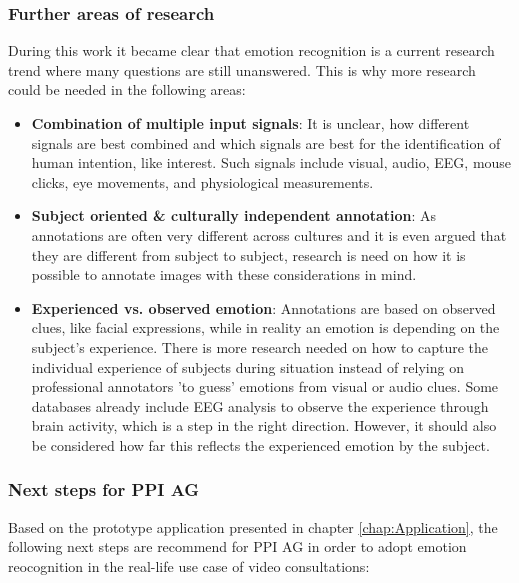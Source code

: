 \subsubsection{Further areas of research}
During this work it became clear that emotion recognition is a current research trend where many questions are still unanswered. This is why more research could be needed in the following areas:
\begin{itemize}
    \item \textbf{Combination of multiple input signals}: It is unclear, how different signals are best combined and which signals are best for the identification of human intention, like interest. Such signals include visual, audio, EEG, mouse clicks, eye movements, and physiological measurements.
    \item \textbf{Subject oriented \& culturally independent annotation}: As annotations are often very different across cultures and it is even argued that they are different from subject to subject, research is need on how it is possible to annotate images with these considerations in mind. 
    \item \textbf{Experienced vs. observed emotion}: Annotations are based on observed clues, like facial expressions, while in reality an emotion is depending on the subject's experience. There is more research needed on how to capture the individual experience of subjects during situation instead of relying on professional annotators 'to guess' emotions from visual or audio clues. Some databases already include EEG analysis to observe the experience through brain activity, which is a step in the right direction. However, it should also be considered how far this reflects the experienced emotion by the subject.
\end{itemize}



\subsubsection{Next steps for PPI AG}
Based on the prototype application presented in chapter \ref{chap:Application}, the following next steps are recommend for PPI AG in order to adopt emotion reocognition in the real-life use case of video consultations:

